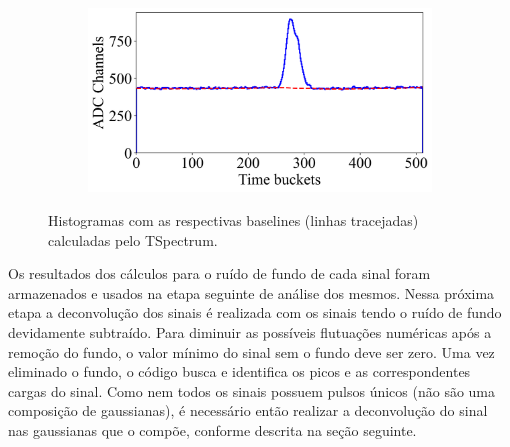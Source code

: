 \documentclass[a4paper,12pt,oneside]{book}
\begin{document}
\begin{figure}[H]
\begin{subfigure}[b]{0.48\textwidth}
        \caption{}
        \label{subfig:ex_sinal_bkg_3}
    \end{subfigure}%
    \hfill
    \begin{subfigure}[b]{0.48\textwidth}
        \centering
        \includegraphics[scale=0.394]{figs/ex_sinal_bkg_4.png}
        \caption{}
        \label{subfig:ex_sinal_bkg_4}
    \end{subfigure}
\caption{Histogramas com as respectivas baselines (linhas tracejadas) calculadas pelo TSpectrum.}
\label{fig:ex_sinal_bkg}
\end{figure}

\par Os resultados dos cálculos para o ruído de fundo de cada sinal foram armazenados e usados na etapa seguinte de análise dos mesmos. Nessa próxima etapa a deconvolução dos sinais é realizada com os sinais tendo o ruído de fundo devidamente subtraído. Para diminuir as possíveis flutuações numéricas após a remoção do fundo, o valor mínimo do sinal sem o fundo deve ser zero. Uma vez eliminado o fundo, o código busca e identifica os picos e as correspondentes cargas do sinal. Como nem todos os sinais possuem pulsos únicos (não são uma composição de gaussianas), é necessário então realizar a deconvolução do sinal nas gaussianas que o compõe, conforme descrita na seção seguinte.


\end{document}
